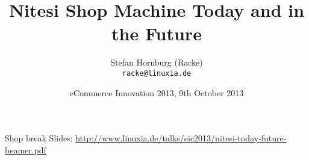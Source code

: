 \usepackage[utf8]{inputenc}
\usepackage[T1]{fontenc}
\usepackage{mathptmx}
\usepackage[scaled=.90]{helvet}
\usepackage{courier}
\usepackage{caption}
\captionsetup{labelformat=empty,labelsep=none}
\usepackage{beamerthemesplit}
\usepackage{verbatim}
\usepackage{hyperref}
\usepackage{listings}
\lstset{language=Perl,basicstyle=\normalsize,tabsize=3,showstringspaces=false}

\title{Nitesi Shop Machine Today and in the Future}
\author[racke]{Stefan Hornburg (Racke)\\ \texttt{racke@linuxia.de}}
\date{eCommerce Innovation 2013, 9th October 2013}


\maketitle{}

\begin{frame}
  \titlepage
\end{frame}

\tableofcontents

\begin{frame}{Shop break}
Slides:
\url{http://www.linuxia.de/talks/eic2013/nitesi-today-future-beamer.pdf}
\end{frame}



